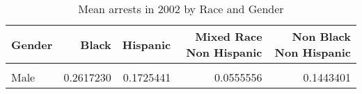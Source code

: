 \begin{table}[H]

\caption{\label{tab:tab:summarystats}Mean arrests in 2002 by Race and Gender}
\centering
\begin{tabular}[t]{lrrrr}
\toprule
Gender & Black & Hispanic & Mixed Race Non Hispanic & Non Black Non Hispanic\\
\midrule
\cellcolor{gray!6}{Female} & \cellcolor{gray!6}{0.0500481} & \cellcolor{gray!6}{0.0251497} & \cellcolor{gray!6}{0.0967742} & \cellcolor{gray!6}{0.0510659}\\
Male & 0.2617230 & 0.1725441 & 0.0555556 & 0.1443401\\
\bottomrule
\end{tabular}
\end{table}
